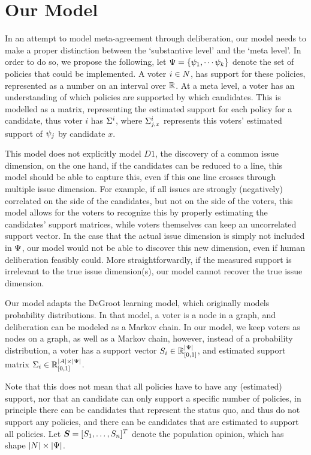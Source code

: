 \section{Our Model} \label{sec: main model}

In an attempt to model meta-agreement through deliberation, our model needs to
make a proper distinction between the `substantive level' and the `meta level'.
In order to do so, we propose the following, let \(\Psi = \{\psi_{1},
\cdots \psi_{k}\}\) denote the set of policies that could be implemented. A
voter $i \in N$, has support for these policies, represented as a number
on an interval over $\mathbb{R}$. At a meta level, a voter has an understanding of
which policies are supported by which candidates. This is modelled as a matrix,
representing the estimated support for each policy for a candidate, thus voter
$i$ has $\Sigma^i$, where $\Sigma^i_{j, x}$ represents this voters'
estimated support of $\psi_j$ by candidate $x$.

This model does not explicitly model $D1$, the discovery of a common issue
dimension, on the one hand, if the candidates can be reduced to a line, this
model should be able to capture this, even if this one line crosses through
multiple issue dimension. For example, if all issues are strongly (negatively)
correlated on the side of the candidates, but not on the side of the voters, this model
allows for the voters to recognize this by properly estimating the
candidates' support matrices, while voters themselves can keep an
uncorrelated support vector. In the case that the actual issue dimension is
simply not included in $\Psi$, our model would not be able to discover
this new dimension, even if human deliberation feasibly could. More
straightforwardly, if the measured support is irrelevant to the true issue
dimension(s), our model cannot recover the true issue dimension.

Our model adapts the DeGroot learning model, which
originally models probability distributions. In that model, a voter is
a node in a graph, and deliberation can be modeled as a Markov chain. In our
model, we keep voters as nodes on a graph, as well as a Markov chain, however,
instead of a probability distribution, a voter has a support vector $S_i \in
	\mathbb{R}^{|\Psi|}_{[0,1]}$, and estimated support matrix $\Sigma_i\in
	\mathbb{R}^{|A| \times |\Psi|}_{[0,1]}$.

Note that this does not mean that all policies have to have any (estimated)
support, nor that an candidate can only support a specific number of
policies, in principle there can be candidates that represent the status quo,
and thus do not support any policies, and there can be candidates that are
estimated to support all policies.  Let $\boldsymbol{S}= [S_1, \dots,
	S_{n}]^{T}$ denote the population opinion, which has shape \(|N|
\times |\Psi|\).

